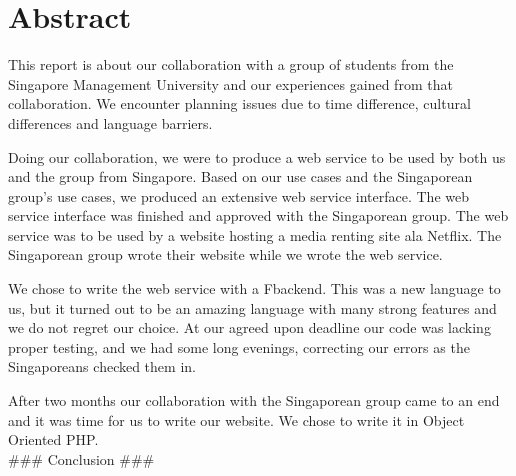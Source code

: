 \section*{Abstract}
This report is about our collaboration with a group of students from the Singapore Management University and our experiences gained from that collaboration. We encounter planning issues due to time difference, cultural differences and language barriers.

Doing our collaboration, we were to produce a web service to be used by both us and the group from Singapore. Based on our use cases and the Singaporean group's use cases, we produced an extensive web service interface. The web service interface was finished and approved with the Singaporean group.
The web service was to be used by a website hosting a media renting site ala Netflix. The Singaporean group wrote their website while we wrote the web service.

We chose to write the web service with a F\Sh backend. This was a new language to us, but it turned out to be an amazing language with many strong features and we do not regret our choice.
At our agreed upon deadline our code was lacking proper testing, and we had some long evenings, correcting our errors as the Singaporeans checked them in.

After two months our collaboration with the Singaporean group came to an end and it was time for us to write our website. We chose to write it in Object Oriented PHP.
\newline
\\
\#\#\# Conclusion \#\#\# 
\newpage